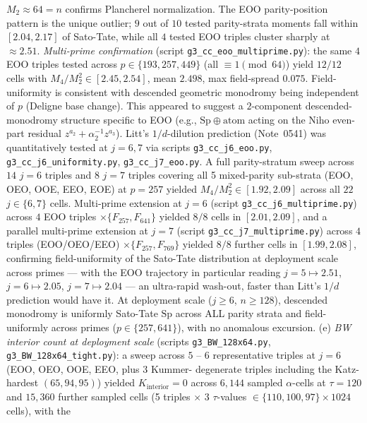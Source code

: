 \documentclass[11pt]{article}
\theoremstyle{definition}
\theoremstyle{remark}
\begin{document}
$M_2 \approx 64 = n$ confirms Plancherel normalization. The EOO
parity-position pattern is the unique outlier; $9$ out of $10$ tested
parity-strata moments fall within $[2.04, 2.17]$ of Sato-Tate, while
all $4$ tested EOO triples cluster sharply at $\approx 2.51$.
\emph{Multi-prime confirmation} (script
\texttt{g3\_cc\_eoo\_multiprime.py}): the same $4$ EOO triples tested
across $p \in \{193, 257, 449\}$ (all $\equiv 1 \pmod{64}$) yield $12/12$
cells with $M_4/M_2^2 \in [2.45, 2.54]$, mean $2.498$, max field-spread
$0.075$. Field-uniformity is consistent with descended geometric
monodromy being independent of $p$ (Deligne base change).
This appeared to suggest a $2$-component descended-monodromy structure
specific to EOO (e.g., $\mathrm{Sp} \oplus \text{atom}$ acting on
the Niho even-part residual $z^{a_2} + \alpha_2^{-1} z^{a_3}$). Litt's
$1/d$-dilution prediction (Note~0541) was quantitatively tested at
$j = 6, 7$ via scripts \texttt{g3\_cc\_j6\_eoo.py},
\texttt{g3\_cc\_j6\_uniformity.py}, \texttt{g3\_cc\_j7\_eoo.py}.
A full parity-stratum sweep across $14$ $j=6$ triples and $8$ $j=7$
triples covering all 5 mixed-parity sub-strata
(EOO, OEO, OOE, EEO, EOE) at $p = 257$ yielded
$M_4/M_2^2 \in [1.92, 2.09]$ across all $22$ $j \in \{6, 7\}$ cells.
Multi-prime extension at $j = 6$ (script
\texttt{g3\_cc\_j6\_multiprime.py}) across $4$ EOO triples $\times \{F_{257}, F_{641}\}$
yielded $8/8$ cells in $[2.01, 2.09]$, and a parallel multi-prime
extension at $j = 7$ (script \texttt{g3\_cc\_j7\_multiprime.py})
across $4$ triples (EOO/OEO/EEO) $\times \{F_{257}, F_{769}\}$ yielded
$8/8$ further cells in $[1.99, 2.08]$, confirming field-uniformity of
the Sato-Tate distribution at deployment scale across primes —
with the EOO trajectory in particular reading
$j=5 \mapsto 2.51$, $j=6 \mapsto 2.05$, $j=7 \mapsto 2.04$ — an
ultra-rapid wash-out, faster than Litt's $1/d$ prediction would have
it. At deployment scale ($j \geq 6$, $n \geq 128$), descended
monodromy is uniformly Sato-Tate $\mathrm{Sp}$ across ALL parity
strata and field-uniformly across primes ($p \in \{257, 641\}$),
with no anomalous excursion. (e) \emph{BW interior count at deployment
scale} (scripts \texttt{g3\_BW\_128x64.py},
\texttt{g3\_BW\_128x64\_tight.py}): a sweep across $5$ -- $6$
representative triples at $j=6$ (EOO, OEO, OOE, EEO, plus 3 Kummer-
degenerate triples including the Katz-hardest $(65, 94, 95)$) yielded
$K_\text{interior} = 0$ across $6{,}144$ sampled $\alpha$-cells at
$\tau = 120$ and $15{,}360$ further sampled cells (5 triples $\times$
3 $\tau$-values $\in \{110, 100, 97\} \times 1024$ cells), with the
\end{document}
